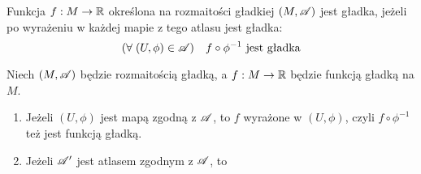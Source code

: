 \begin{definition}
   Funkcja $f:M\to\mathbb{R}$ określona na rozmaitości gładkiej $(M, \mathcal{A})$ jest gładka, jeżeli po wyrażeniu w każdej mapie z tego atlasu jest gładka:
   $$(\forall\;(U,\phi)\in\mathcal{A})\quad f\circ\phi^{-1}\text{ jest gładka}$$
\end{definition}

\begin{fact}
    Niech $(M,\mathcal{A})$ będzie rozmaitością gładką, a $f:M\to\mathbb{R}$ będzie funkcją gładką na $M$.
    \begin{enumerate}
        \item Jeżeli $(U, \phi)$ jest mapą zgodną z $\mathcal{A}$, to $f$ wyrażone w $(U, \phi)$, czyli $f\circ\phi^{-1}$ też jest funkcją gładką.
        \item Jeżeli $\mathcal{A}'$ jest atlasem zgodnym z $\mathcal{A}$, to 
    \end{enumerate}
\end{fact}

%
%
